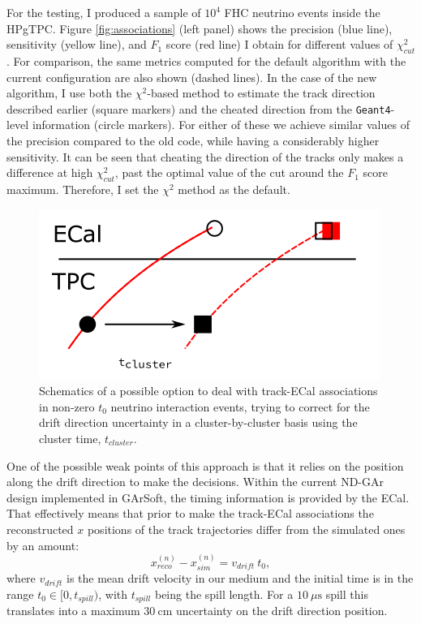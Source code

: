 For the testing, I produced a sample of $10^{4}$ FHC neutrino events inside the HPgTPC. Figure \ref{fig:associations} (left panel) shows the precision (blue line), sensitivity (yellow line), and $F_{1}$ score (red line) I obtain for different values of $\chi^{2}_{cut}$. For comparison, the same metrics computed for the default algorithm with the current configuration are also shown (dashed lines). In the case of the new algorithm, I use both the $\chi^{2}$-based method to estimate the track direction described earlier (square markers) and the cheated direction from the \texttt{Geant4}-level information (circle markers). For either of these we achieve similar values of the precision compared to the old code, while having a considerably higher sensitivity. It can be seen that cheating the direction of the tracks only makes a difference at high $\chi^{2}_{cut}$, past the optimal value of the cut around the $F_{1}$ score maximum. Therefore, I set the $\chi^{2}$ method as the default.

\begin{figure}[t]
	\centering
	\includegraphics[width=.55\linewidth]{Images/GArSoft_PID/associations/drift_correction.png}
	\caption[Schematics of a method to deal with track-ECal associations in non-zero $t_{0}$ neutrino interaction events using the cluster time.]{Schematics of a possible option to deal with track-ECal associations in non-zero $t_{0}$ neutrino interaction events, trying to correct for the drift direction uncertainty in a cluster-by-cluster basis using the cluster time, $t_{cluster}$.}
	\label{fig:associations_drift}
\end{figure}

One of the possible weak points of this approach is that it relies on the position along the drift direction to make the decisions. Within the current ND-GAr design implemented in GArSoft, the timing information is provided by the ECal. That effectively means that prior to make the track-ECal associations the reconstructed $x$ positions of the track trajectories differ from the simulated ones by an amount:
\begin{equation}
	x_{reco}^{(n)} - x_{sim}^{(n)} = v_{drift} \ t_{0},
\end{equation}
where $v_{drift}$ is the mean drift velocity in our medium and the initial time is in the range $t_{0}\in[0, t_{spill})$, with $t_{spill}$ being the spill length. For a $10 \ \mu\mathrm{s}$ spill this translates into a maximum $30 \ \mathrm{cm}$ uncertainty on the drift direction position.

